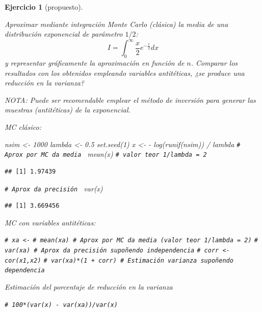 \documentclass[
]{book}
\newenvironment{Shaded}{\begin{snugshade}}{\end{snugshade}}
\newcommand{\CommentTok}[1]{\textcolor[rgb]{0.56,0.35,0.01}{\textit{#1}}}
\newcommand{\DecValTok}[1]{\textcolor[rgb]{0.00,0.00,0.81}{#1}}
\newcommand{\FloatTok}[1]{\textcolor[rgb]{0.00,0.00,0.81}{#1}}
\newcommand{\FunctionTok}[1]{\textcolor[rgb]{0.00,0.00,0.00}{#1}}
\newcommand{\NormalTok}[1]{#1}
\newcommand{\OtherTok}[1]{\textcolor[rgb]{0.56,0.35,0.01}{#1}}
\newcommand{\SpecialCharTok}[1]{\textcolor[rgb]{0.00,0.00,0.00}{#1}}
\theoremstyle{break}
\newtheorem{exercise}{Ejercicio}[chapter]
\theoremstyle{nonumberplain}
\renewcommand{\CommentTok}[1]{\textcolor[rgb]{0.41,0.41,0.41}{\texttt{#1}}}
\begin{document}
\begin{exercise}[propuesto]
\protect\hypertarget{exr:int-ainv}{}\label{exr:int-ainv}

Aproximar mediante integración Monte Carlo (clásica) la media de una distribución exponencial de parámetro \(1/2\):
\[I=\int_{0}^{\infty}\frac{x}{2}e^{-\frac{x}{2}}dx\]
y representar gráficamente la aproximación en función de \(n\).
Comparar los resultados con los obtenidos empleando variables antitéticas,
¿se produce una reducción en la varianza?

NOTA: Puede ser recomendable emplear el método de inversión para generar las muestras (antitéticas) de la exponencial.

MC clásico:

\begin{Shaded}
\begin{Highlighting}[]
\NormalTok{nsim }\OtherTok{\textless{}{-}} \DecValTok{1000}
\NormalTok{lambda }\OtherTok{\textless{}{-}} \FloatTok{0.5}
\FunctionTok{set.seed}\NormalTok{(}\DecValTok{1}\NormalTok{)}
\NormalTok{x }\OtherTok{\textless{}{-}} \SpecialCharTok{{-}} \FunctionTok{log}\NormalTok{(}\FunctionTok{runif}\NormalTok{(nsim)) }\SpecialCharTok{/}\NormalTok{ lambda}
\CommentTok{\# Aprox por MC da media }
\FunctionTok{mean}\NormalTok{(x) }\CommentTok{\# valor teor 1/lambda = 2}
\end{Highlighting}
\end{Shaded}

\begin{verbatim}
## [1] 1.97439
\end{verbatim}

\begin{Shaded}
\begin{Highlighting}[]
\CommentTok{\# Aprox da precisión }
\FunctionTok{var}\NormalTok{(x)  }
\end{Highlighting}
\end{Shaded}

\begin{verbatim}
## [1] 3.669456
\end{verbatim}

MC con variables antitéticas:

\begin{Shaded}
\begin{Highlighting}[]
\CommentTok{\# xa \textless{}{-}}
\CommentTok{\# mean(xa) \# Aprox por MC da media (valor teor 1/lambda = 2)}
\CommentTok{\# var(xa)  \# Aprox da precisión supoñendo independencia}
\CommentTok{\# corr \textless{}{-} cor(x1,x2)}
\CommentTok{\# var(xa)*(1 + corr) \# Estimación varianza supoñendo dependencia}
\end{Highlighting}
\end{Shaded}

Estimación del porcentaje de reducción en la varianza

\begin{Shaded}
\begin{Highlighting}[]
\CommentTok{\# 100*(var(x) {-} var(xa))/var(x)}
\end{Highlighting}
\end{Shaded}

\end{exercise}
\end{document}
